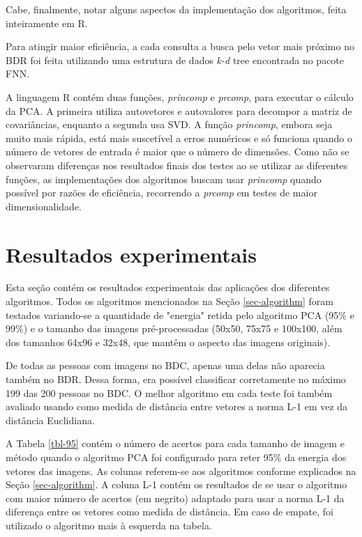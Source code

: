 \documentclass[10pt,twocolumn,letterpaper]{article}
\begin{document}
Cabe, finalmente, notar alguns aspectos da implementação dos algoritmos, feita inteiramente em R.

Para atingir maior eficiência, a cada consulta a busca pelo vetor mais próximo no BDR foi feita utilizando uma estrutura de dados \emph{k-d} tree encontrada no pacote FNN.

A linguagem R contém duas funções, \emph{princomp} e \emph{prcomp}, para executar o cálculo da PCA. A primeira utiliza autovetores e autovalores para decompor a matriz de covariâncias, enquanto a segunda usa SVD. A função \emph{princomp}, embora seja muito mais rápida, está mais suscetível a erros numéricos e só funciona quando o número de vetores de entrada é maior que o número de dimensões. Como não se observaram diferenças nos resultados finais dos testes ao se utilizar as diferentes funções, as implementações dos algoritmos buscam usar \emph{princomp} quando possível por razões de eficiência, recorrendo a \emph{prcomp} em testes de maior dimensionalidade.

\section{Resultados experimentais}
\label{sec-experiments}

Esta seção contém os resultados experimentais das aplicações dos diferentes algoritmos. Todos os algoritmos mencionados na Seção \ref{sec-algorithm} foram testados variando-se a quantidade de "energia" retida pelo algoritmo PCA (95\% e 99\%) e o tamanho das imagens pré-processadas (50x50, 75x75 e 100x100, além dos tamanhos 64x96 e 32x48, que mantêm o aspecto das imagens originais).

De todas as pessoas com imagens no BDC, apenas uma delas não aparecia também no BDR. Dessa forma, era possível classificar corretamente no máximo 199 das 200 pessoas no BDC. O melhor algoritmo em cada teste foi também avaliado usando como medida de distância entre vetores a norma L-1 em vez da distância Euclidiana.

A Tabela \ref{tbl-95} contém o número de acertos para cada tamanho de imagem e método quando o algoritmo PCA foi configurado para reter 95\% da energia dos vetores das imagens. As colunas referem-se aos algoritmos conforme explicados na Seção \ref{sec-algorithm}. A coluna L-1 contém os resultados de se usar o algoritmo com maior número de acertos (em negrito) adaptado para usar a norma L-1 da diferença entre os vetores como medida de distância. Em caso de empate, foi utilizado o algoritmo mais à esquerda na tabela.
\end{document}

